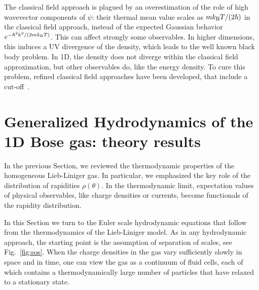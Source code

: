 \documentclass[onecolumn,amsfonts,showpacs,superscriptaddress]{revtex4-1}
\begin{document}

The classical field  approach is plagued by an overestimation of the role of high wavevector components of $\psi$: their thermal mean value scales as $m k_{{\rm B}} T/(2\hbar)$ in the classical field approach, instead of the expected Gaussian behavior $e^{-\hbar^2 k^2/(2m k_{{\rm B}} T)}$. 
This can affect strongly some observables. In higher dimensions, this induces  a UV divergence of the density, which leads to the well known black body problem.
In 1D, the density does not diverge within the classical field approximation, but other observables do, like the energy density.  
To cure this problem, refined classical field approaches have been developed, that include a cut-off~\citep{davis_simulations_2001,blakie_dynamics_2008,cockburn_comparison_2011,cockburn_quantitative_2011}.




\newpage

\section{Generalized Hydrodynamics of the 1D Bose gas: theory results}
\label{sec:GHDtheory}

In the previous Section, we reviewed the thermodynamic properties of the homogeneous Lieb-Liniger gas. In particular, we emphasized the key role of the distribution of rapidities $\rho(\theta)$. In the thermodynamic limit, expectation values of physical observables, like charge densities or currents,  become functionals of the rapidity distribution.


In this Section we turn to the Euler scale hydrodynamic equations that follow from the thermodynamics of the Lieb-Liniger model. As in any hydrodynamic approach, the starting point is the assumption of separation of scales, see Fig.~\ref{fig:sos}. When the charge densities in the gas vary sufficiently slowly in space and in time, one can view the gas as a continuum of fluid cells, each of which contains a thermodynamically large number of particles that have relaxed to a stationary state.
\end{document}
